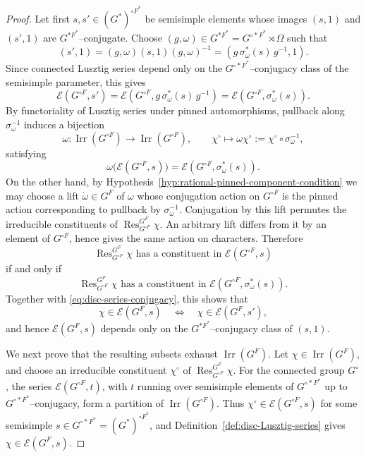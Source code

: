 \documentclass{amsart}
\theoremstyle{plain}
\numberwithin{equation}{section}
\theoremstyle{definition}
\newcommand{\cE}{\mathcal{E}}
\newcommand{\Res}{\operatorname{Res}}
\newcommand{\Irr}{\operatorname{Irr}}
\begin{document}
\begin{proof}
Let first $s,s'\in (G^*)^{\circ F^*}$ be semisimple elements whose images
$(s,1)$ and $(s',1)$ are $G^{*F^*}$--conjugate.  Choose
$(g,\omega)\in G^{*F^*}=G^{\circ *F^*}\rtimes \Omega$ such that
\[
(s',1)=(g,\omega)(s,1)(g,\omega)^{-1}=(g\,\sigma_\omega^*(s)\,g^{-1},1).
\]
Since connected Lusztig series depend only on the
$G^{\circ *F^*}$--conjugacy class of the semisimple parameter, this gives
\begin{equation}\label{eq:disc-series-conjugacy}
\cE(G^{\circ F},s')=
\cE(G^{\circ F},g\,\sigma_\omega^*(s)\,g^{-1})=
\cE(G^{\circ F},\sigma_\omega^*(s)).
\end{equation}
By functoriality of Lusztig series under pinned automorphisms, pullback along
$\sigma_\omega^{-1}$ induces a bijection
\[
\omega:\Irr(G^{\circ F})\to \Irr(G^{\circ F}),
\qquad
\chi^\circ\longmapsto \omega\chi^\circ:=\chi^\circ\circ\sigma_\omega^{-1},
\]
satisfying
\begin{equation}\label{eq:pinned-action-on-disc-series}
\omega\bigl(\cE(G^{\circ F},s)\bigr)
=
\cE(G^{\circ F},\sigma_\omega^*(s)).
\end{equation}
On the other hand, by Hypothesis~\ref{hyp:rational-pinned-component-condition}
we may choose a lift $\dot\omega\in G^F$ of $\omega$ whose conjugation action
on $G^{\circ F}$ is the pinned action corresponding to pullback by
$\sigma_\omega^{-1}$.  Conjugation by this lift permutes the irreducible
constituents of $\Res^{G^F}_{G^{\circ F}}\chi$.  An arbitrary lift differs
from it by an element of $G^{\circ F}$, hence gives the same action on
characters.  Therefore
\[
\Res^{G^F}_{G^{\circ F}}\chi \text{ has a constituent in }\cE(G^{\circ F},s)
\]
if and only if
\[
\Res^{G^F}_{G^{\circ F}}\chi \text{ has a constituent in }
\cE(G^{\circ F},\sigma_\omega^*(s)).
\]
Together with \eqref{eq:disc-series-conjugacy}, this shows that
\[
\chi\in \cE(G^F,s)
\quad\Longleftrightarrow\quad
\chi\in \cE(G^F,s'),
\]
and hence $\cE(G^F,s)$ depends only on the $G^{*F^*}$--conjugacy class of
$(s,1)$.

We next prove that the resulting subsets exhaust $\Irr(G^F)$.  Let
$\chi\in\Irr(G^F)$, and choose an irreducible constituent $\chi^\circ$ of
$\Res^{G^F}_{G^{\circ F}}\chi$.  For the connected group $G^\circ$, the
series $\cE(G^{\circ F},t)$, with $t$ running over semisimple elements of
$G^{\circ *F^*}$ up to $G^{\circ *F^*}$--conjugacy, form a partition of
$\Irr(G^{\circ F})$.  Thus $\chi^\circ\in \cE(G^{\circ F},s)$ for some
semisimple $s\in G^{\circ *F^*}=(G^*)^{\circ F^*}$, and
Definition~\ref{def:disc-Lusztig-series} gives $\chi\in \cE(G^F,s)$.


\end{proof}
\end{document}
